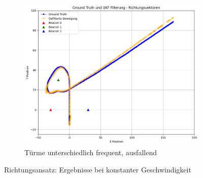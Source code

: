 \begin{figure}
\begin{subfigure}{.333\textwidth}
        \centering
        \includegraphics[width=.9\linewidth]{Ergebnisse/plots_fahrten/richtung/richtung_dyn_acc_flag_freq.png}
        \caption{Türme unterschiedlich frequent, ausfallend}
    \end{subfigure}
    \caption{Richtungsansatz: Ergebnisse bei konstanter Geschwindigkeit}
\end{figure}